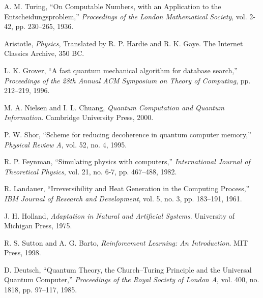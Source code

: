 \documentclass[12pt]{article}
\begin{document}
\begin{thebibliography}{99}

A. M. Turing, ``On Computable Numbers, with an Application to the Entscheidungsproblem,'' \emph{Proceedings of the London Mathematical Society}, vol. 2-42, pp. 230--265, 1936.

Aristotle, \emph{Physics}, Translated by R. P. Hardie and R. K. Gaye. The Internet Classics Archive, 350 BC.

L. K. Grover, ``A fast quantum mechanical algorithm for database search,'' \emph{Proceedings of the 28th Annual ACM Symposium on Theory of Computing}, pp. 212--219, 1996.

M. A. Nielsen and I. L. Chuang, \emph{Quantum Computation and Quantum Information}. Cambridge University Press, 2000.

P. W. Shor, ``Scheme for reducing decoherence in quantum computer memory,'' \emph{Physical Review A}, vol. 52, no. 4, 1995.

R. P. Feynman, ``Simulating physics with computers,'' \emph{International Journal of Theoretical Physics}, vol. 21, no. 6-7, pp. 467--488, 1982.

R. Landauer, ``Irreversibility and Heat Generation in the Computing Process,'' \emph{IBM Journal of Research and Development}, vol. 5, no. 3, pp. 183--191, 1961.

J. H. Holland, \emph{Adaptation in Natural and Artificial Systems}. University of Michigan Press, 1975.

R. S. Sutton and A. G. Barto, \emph{Reinforcement Learning: An Introduction}. MIT Press, 1998.

D. Deutsch, ``Quantum Theory, the Church–Turing Principle and the Universal Quantum Computer,'' \emph{Proceedings of the Royal Society of London A}, vol. 400, no. 1818, pp. 97--117, 1985.

\end{thebibliography}
\end{document}
